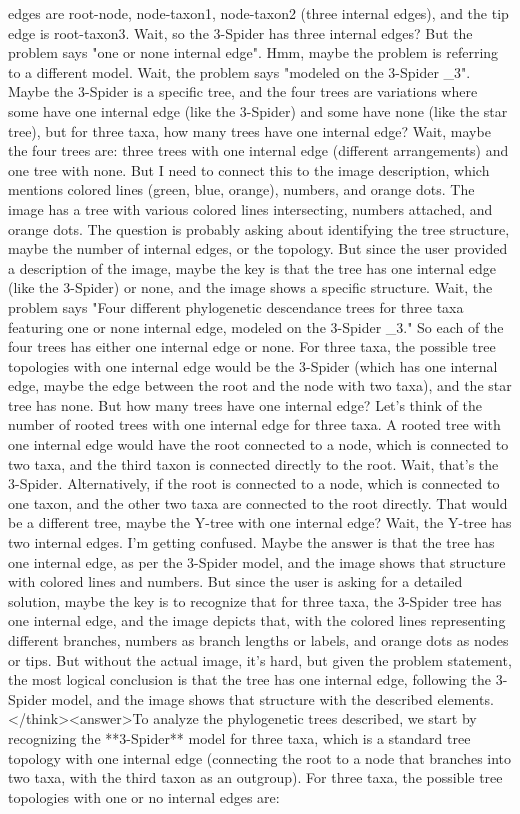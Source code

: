 edges are root-node, node-taxon1, node-taxon2 (three internal edges), and the tip edge is root-taxon3. Wait, so the 3-Spider has three internal edges? But the problem says "one or none internal edge". Hmm, maybe the problem is referring to a different model. Wait, the problem says "modeled on the 3-Spider _3". Maybe the 3-Spider is a specific tree, and the four trees are variations where some have one internal edge (like the 3-Spider) and some have none (like the star tree), but for three taxa, how many trees have one internal edge? Wait, maybe the four trees are: three trees with one internal edge (different arrangements) and one tree with none. But I need to connect this to the image description, which mentions colored lines (green, blue, orange), numbers, and orange dots. The image has a tree with various colored lines intersecting, numbers attached, and orange dots. The question is probably asking about identifying the tree structure, maybe the number of internal edges, or the topology. But since the user provided a description of the image, maybe the key is that the tree has one internal edge (like the 3-Spider) or none, and the image shows a specific structure. Wait, the problem says "Four different phylogenetic descendance trees for three taxa featuring one or none internal edge, modeled on the 3-Spider _3." So each of the four trees has either one internal edge or none. For three taxa, the possible tree topologies with one internal edge would be the 3-Spider (which has one internal edge, maybe the edge between the root and the node with two taxa), and the star tree has none. But how many trees have one internal edge? Let's think of the number of rooted trees with one internal edge for three taxa. A rooted tree with one internal edge would have the root connected to a node, which is connected to two taxa, and the third taxon is connected directly to the root. Wait, that's the 3-Spider. Alternatively, if the root is connected to a node, which is connected to one taxon, and the other two taxa are connected to the root directly. That would be a different tree, maybe the Y-tree with one internal edge? Wait, the Y-tree has two internal edges. I'm getting confused. Maybe the answer is that the tree has one internal edge, as per the 3-Spider model, and the image shows that structure with colored lines and numbers. But since the user is asking for a detailed solution, maybe the key is to recognize that for three taxa, the 3-Spider tree has one internal edge, and the image depicts that, with the colored lines representing different branches, numbers as branch lengths or labels, and orange dots as nodes or tips. But without the actual image, it's hard, but given the problem statement, the most logical conclusion is that the tree has one internal edge, following the 3-Spider model, and the image shows that structure with the described elements.</think><answer>To analyze the phylogenetic trees described, we start by recognizing the **3-Spider** model for three taxa, which is a standard tree topology with one internal edge (connecting the root to a node that branches into two taxa, with the third taxon as an outgroup). For three taxa, the possible tree topologies with one or no internal edges are:  
